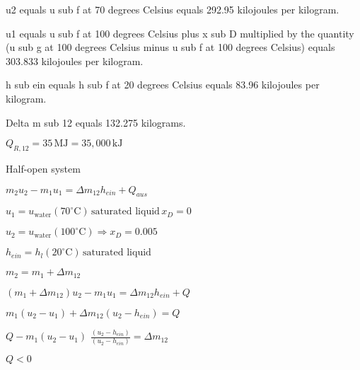 u2 equals u sub f at 70 degrees Celsius equals 292.95 kilojoules per kilogram.  

u1 equals u sub f at 100 degrees Celsius plus x sub D multiplied by the quantity (u sub g at 100 degrees Celsius minus u sub f at 100 degrees Celsius) equals 303.833 kilojoules per kilogram.  

h sub ein equals h sub f at 20 degrees Celsius equals 83.96 kilojoules per kilogram.  

Delta m sub 12 equals 132.275 kilograms.

\( Q_{R,12} = 35 \, \text{MJ} = 35,000 \, \text{kJ} \)  

Half-open system  

\( m_2 u_2 - m_1 u_1 = \Delta m_{12} h_{ein} + Q_{aus} \)  

\( u_1 = u_{\text{water}} (70^\circ \text{C}) \, \text{saturated liquid} \, x_D = 0 \)  

\( u_2 = u_{\text{water}} (100^\circ \text{C}) \Rightarrow x_D = 0.005 \)  

\( h_{ein} = h_{l} (20^\circ \text{C}) \, \text{saturated liquid} \)  

\( m_2 = m_1 + \Delta m_{12} \)  

\( (m_1 + \Delta m_{12}) u_2 - m_1 u_1 = \Delta m_{12} h_{ein} + Q \)  

\( m_1 (u_2 - u_1) + \Delta m_{12} (u_2 - h_{ein}) = Q \)  

\( Q - m_1 (u_2 - u_1) \)  
\( \frac{(u_2 - h_{ein})}{(u_2 - h_{ein})} = \Delta m_{12} \)  

\( Q < 0 \)